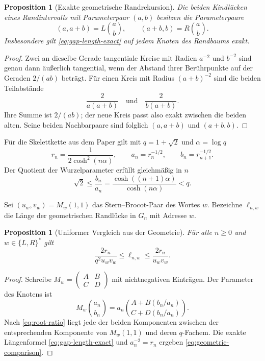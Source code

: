 \documentclass[11pt,a4paper]{article}
\newtheorem{proposition}[remark]{Proposition}
\begin{document}
\begin{proposition}[Exakte geometrische Randrekursion]
Die beiden Kindlücken eines Randintervalls mit Parameterpaar $(a,b)$ besitzen
die Parameterpaare
\[
 (a,a+b)=L\binom{a}{b},
 \qquad
 (a+b,b)=R\binom{a}{b}.
\]
Insbesondere gilt \eqref{eq:gap-length-exact} auf jedem Knoten des
Randbaums exakt.
\end{proposition}

\begin{proof}
Zwei an dieselbe Gerade tangentiale Kreise mit Radien $a^{-2}$ und $b^{-2}$
sind genau dann äußerlich tangential, wenn der Abstand ihrer Berührpunkte auf
der Geraden $2/(ab)$ beträgt. Für einen Kreis mit Radius $(a+b)^{-2}$ sind
die beiden Teilabstände
\[
 \frac{2}{a(a+b)}
 \quad\text{und}\quad
 \frac{2}{b(a+b)}.
\]
Ihre Summe ist $2/(ab)$; der neue Kreis passt also exakt zwischen die beiden
alten. Seine beiden Nachbarpaare sind folglich $(a,a+b)$ und $(a+b,b)$.
\end{proof}

Für die Skelettkette aus dem Paper gilt mit $q=1+\sqrt2$ und
$\alpha=\log q$
\[
 r_n=\frac{1}{2\cosh^2(n\alpha)},
 \qquad
 a_n=r_n^{-1/2},\qquad b_n=r_{n+1}^{-1/2}.
\]
Der Quotient der Wurzelparameter erfüllt gleichmäßig in $n$
\begin{equation}\label{eq:root-ratio}
 \sqrt2\le \frac{b_n}{a_n}
 =\frac{\cosh((n+1)\alpha)}{\cosh(n\alpha)}<q.
\end{equation}

Sei $(u_w,v_w)=M_w(1,1)$ das Stern--Brocot-Paar des Wortes $w$. Bezeichne
$\ell_{n,w}$ die Länge der geometrischen Randlücke in $G_n$ mit Adresse $w$.

\begin{proposition}[Uniformer Vergleich aus der Geometrie]
Für alle $n\ge0$ und $w\in\{L,R\}^*$ gilt
\begin{equation}\label{eq:geometric-comparison}
 \frac{2r_n}{q^2u_wv_w}
 \le \ell_{n,w}\le
 \frac{2r_n}{u_wv_w}.
\end{equation}
\end{proposition}

\begin{proof}
Schreibe $M_w=\left(\begin{smallmatrix}A&B\\C&D\end{smallmatrix}\right)$
mit nichtnegativen Einträgen. Der Parameter des Knotens ist
\[
 M_w\binom{a_n}{b_n}
 =a_n\binom{A+B(b_n/a_n)}{C+D(b_n/a_n)}.
\]
Nach \eqref{eq:root-ratio} liegt jede der beiden Komponenten zwischen der
entsprechenden Komponente von $M_w(1,1)$ und deren $q$-Fachem. Die exakte
Längenformel \eqref{eq:gap-length-exact} und $a_n^{-2}=r_n$ ergeben
\eqref{eq:geometric-comparison}.
\end{proof}
\end{document}
